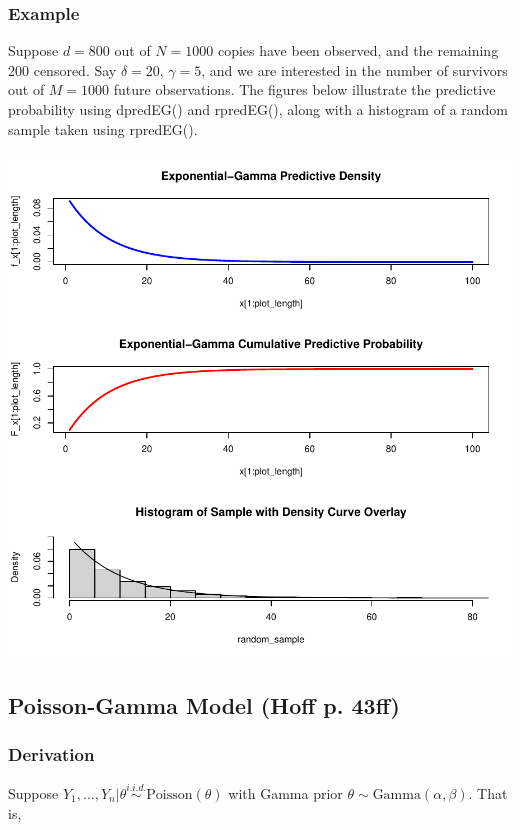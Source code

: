 \documentclass[12pt, a4paper]{article}
\begin{document}
    \subsubsection{Example}

Suppose $d=800$ out of $N = 1000$ copies have been observed, and the remaining $200$ censored.  Say $\delta = 20$, $\gamma=5$, and we are interested in the number of survivors out of $M = 1000$ future observations.  The figures below illustrate the predictive probability using dpredEG() and rpredEG(), along with a histogram of a random sample taken using rpredEG().


\includegraphics{Thesis_v1-004}

\clearpage

  \subsection{Poisson-Gamma Model (Hoff p. 43ff)}
    \subsubsection{Derivation}

      Suppose $Y_1,...,Y_n|\theta\overset{i.i.d.}{\sim}\text{Poisson}(\theta)$ with Gamma prior $\theta\sim\text{Gamma}(\alpha,\beta)$.  That is,
\end{document}
